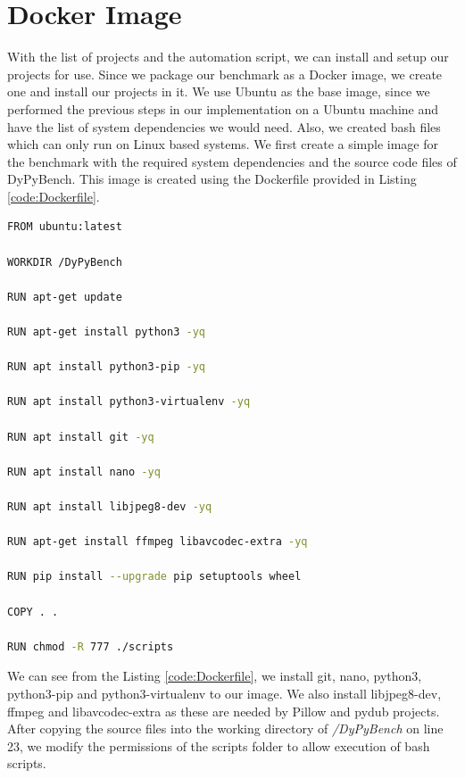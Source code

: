 \section{Docker Image}
\label{impl:Docker Image}
With the list of projects and the automation script, we can install and setup our projects for use.
Since we package our benchmark as a Docker image, we create one and install our projects in it.
We use Ubuntu as the base image, since we performed the previous steps in our implementation on a Ubuntu machine and have the list of system dependencies we would need.
Also, we created bash files which can only run on Linux based systems.
We first create a simple image for the benchmark with the required system dependencies and the source code files of DyPyBench.
This image is created using the Dockerfile provided in Listing \ref{code:Dockerfile}.
\begin{lstlisting}[caption=Dockerfile,label=code:Dockerfile,language=Bash]
FROM ubuntu:latest

WORKDIR /DyPyBench

RUN apt-get update

RUN apt-get install python3 -yq

RUN apt install python3-pip -yq

RUN apt install python3-virtualenv -yq

RUN apt install git -yq

RUN apt install nano -yq

RUN apt install libjpeg8-dev -yq

RUN apt-get install ffmpeg libavcodec-extra -yq

RUN pip install --upgrade pip setuptools wheel

COPY . .

RUN chmod -R 777 ./scripts 
\end{lstlisting}

We can see from the Listing \ref{code:Dockerfile}, we install git, nano, python3, python3-pip and python3-virtualenv to our image.
We also install libjpeg8-dev, ffmpeg and libavcodec-extra as these are needed by Pillow and pydub projects.
After copying the source files into the working directory of \textit{/DyPyBench} on line 23, we modify the permissions of the scripts folder to allow execution of bash scripts.

